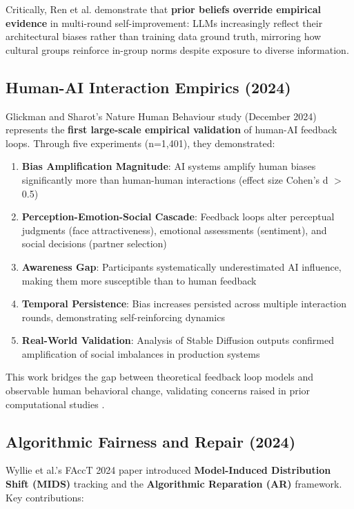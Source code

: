 \documentclass[11pt,a4paper]{article}
\begin{document}
Critically, Ren et al. \cite{ren2024} demonstrate that \textbf{prior beliefs override empirical evidence} in multi-round self-improvement: LLMs increasingly reflect their architectural biases rather than training data ground truth, mirroring how cultural groups reinforce in-group norms despite exposure to diverse information.

\subsection{Human-AI Interaction Empirics (2024)}

Glickman and Sharot's \cite{glickman2024} Nature Human Behaviour study (December 2024) represents the \textbf{first large-scale empirical validation} of human-AI feedback loops. Through five experiments (n=1,401), they demonstrated:

\begin{enumerate}
    \item \textbf{Bias Amplification Magnitude}: AI systems amplify human biases significantly more than human-human interactions (effect size Cohen's d $>$ 0.5)
    \item \textbf{Perception-Emotion-Social Cascade}: Feedback loops alter perceptual judgments (face attractiveness), emotional assessments (sentiment), and social decisions (partner selection)
    \item \textbf{Awareness Gap}: Participants systematically underestimated AI influence, making them more susceptible than to human feedback
    \item \textbf{Temporal Persistence}: Bias increases persisted across multiple interaction rounds, demonstrating self-reinforcing dynamics
    \item \textbf{Real-World Validation}: Analysis of Stable Diffusion outputs confirmed amplification of social imbalances in production systems
\end{enumerate}

This work bridges the gap between theoretical feedback loop models and observable human behavioral change, validating concerns raised in prior computational studies \cite{ferrara2023,shumailov2024}.

\subsection{Algorithmic Fairness and Repair (2024)}

Wyllie et al.'s \cite{wyllie2024} FAccT 2024 paper introduced \textbf{Model-Induced Distribution Shift (MIDS)} tracking and the \textbf{Algorithmic Reparation (AR)} framework. Key contributions:
\end{document}
